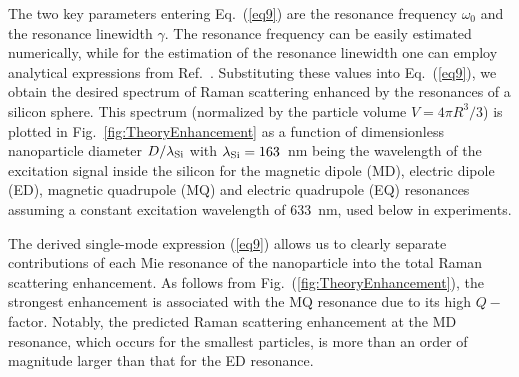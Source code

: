         The two key parameters entering Eq.~(\ref{eq9}) are the resonance frequency $\omega_0$ and the resonance linewidth $\gamma$.
        The resonance frequency can be easily estimated numerically, while for the estimation of the resonance linewidth one can
        employ analytical expressions from Ref.~\cite{lai1991effect}. Substituting these values into Eq.~(\ref{eq9}), we obtain the desired
        spectrum of Raman scattering enhanced by the resonances of a silicon sphere. This spectrum (normalized by the particle
        volume $V=4\pi R^3/3$) is plotted in Fig.~\ref{fig:TheoryEnhancement} as a  function of dimensionless nanoparticle diameter $D/\lambda_{\rm Si}$
        with $\lambda_{\rm Si}=163$~nm being the wavelength of the excitation signal inside the silicon for the magnetic dipole (MD), electric dipole (ED),
        magnetic quadrupole (MQ) and electric quadrupole (EQ) resonances assuming a constant excitation wavelength of 633~nm,
        used below in experiments.

        The derived single-mode expression (\ref{eq9}) allows us to clearly separate contributions of each Mie resonance of the
        nanoparticle into the total Raman scattering enhancement. As follows from Fig.~(\ref{fig:TheoryEnhancement}), the strongest enhancement
        is associated with the MQ resonance due to its high $Q-$factor. Notably, the predicted Raman scattering enhancement
        at the MD resonance, which occurs for the smallest particles, is more than an order of magnitude larger than that for
        the ED resonance.
\clearpage
